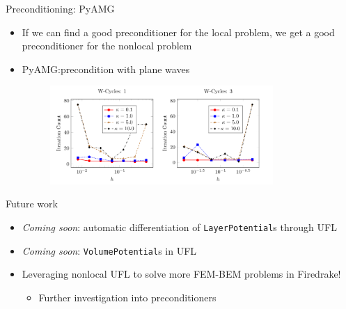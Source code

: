 \documentclass{beamer}
\begin{document}
\begin{frame}{Preconditioning: PyAMG}
    \begin{itemize}
        \item If we can find a good preconditioner for the local
            problem, we get a good preconditioner for the nonlocal
            problem
        \vfill
        \item<2->PyAMG:\@ precondition with plane waves
            \begin{figure}[ht]
            \begin{center}
                \includegraphics[width=0.8\textwidth]{images/pyamg.png}
            \end{center}
            \end{figure}
    \end{itemize}
\end{frame}

\begin{frame}{Future work}
    \begin{itemize}
        \item<1-> \emph{Coming soon}: automatic differentiation of \texttt{LayerPotential}s through UFL
        \vfill
        \item<2-> \emph{Coming soon}: \texttt{VolumePotential}s in UFL
        \vfill
        \item<3-> Leveraging nonlocal UFL to solve more FEM-BEM problems in Firedrake!
            \begin{itemize}
                \item Further investigation into preconditioners
            \end{itemize}
    \end{itemize}
\end{frame}
\end{document}
